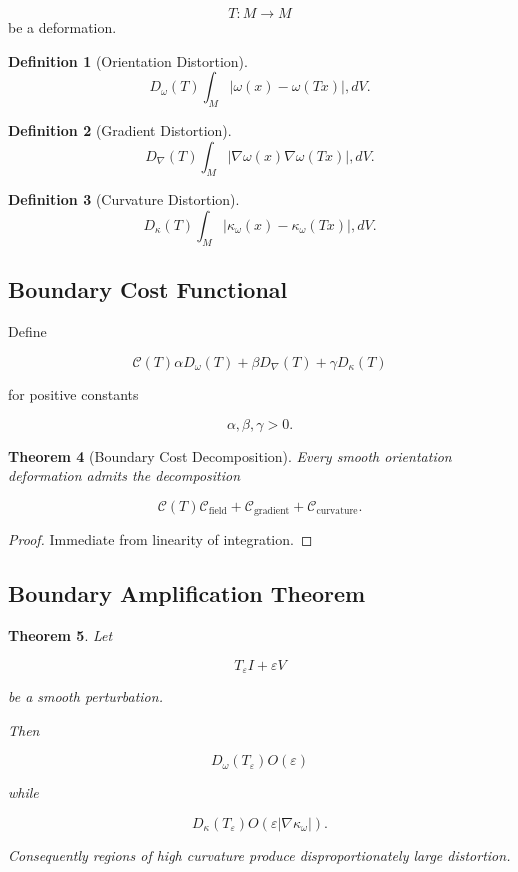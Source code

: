 \documentclass[12pt]{article}
\newtheorem{theorem}{Theorem}[section]
\newtheorem{definition}[theorem]{Definition}
\theoremstyle{remark}
\begin{document}
\[
T:M\rightarrow M
\]
be a deformation.

\begin{definition}[Orientation Distortion]
\[
D_\omega(T)
\int_M
|\omega(x)-\omega(Tx)|
,dV.
\]
\end{definition}

\begin{definition}[Gradient Distortion]
\[
D_{\nabla}(T)
\int_M
|
\nabla\omega(x)

\nabla\omega(Tx)
|
,dV.
\]
\end{definition}

\begin{definition}[Curvature Distortion]
\[
D_\kappa(T)
\int_M
|\kappa_\omega(x)-\kappa_\omega(Tx)|
,dV.
\]
\end{definition}

\subsection{Boundary Cost Functional}

Define

\[
\mathcal C(T)
\alpha D_\omega(T)
+
\beta D_{\nabla}(T)
+
\gamma D_\kappa(T)
\]

for positive constants

\[
\alpha,\beta,\gamma>0.
\]
\begin{theorem}[Boundary Cost Decomposition]
Every smooth orientation deformation admits the decomposition

\[
\mathcal C(T)
\mathcal C_{\text{field}}
+
\mathcal C_{\text{gradient}}
+
\mathcal C_{\text{curvature}}.
\]
\end{theorem}

\begin{proof}
Immediate from linearity of integration.
\end{proof}

\subsection{Boundary Amplification Theorem}

\begin{theorem}
Let

\[
T_\varepsilon
I+\varepsilon V
\]

be a smooth perturbation.

Then

\[
D_\omega(T_\varepsilon)
O(\varepsilon)
\]

while

\[
D_\kappa(T_\varepsilon)
O(\varepsilon |\nabla\kappa_\omega|).
\]

Consequently regions of high curvature produce disproportionately large distortion.
\end{theorem}
\end{document}
